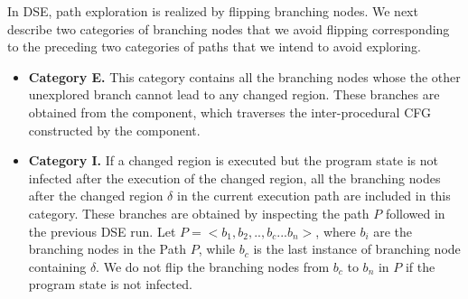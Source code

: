 In DSE, path exploration is realized by flipping branching nodes. We next describe two categories of branching nodes that we avoid flipping corresponding to the preceding two categories of paths that we intend to avoid exploring.
\begin{itemize}

\item \textbf{Category E.} This category contains all the branching nodes whose the other unexplored branch cannot lead to any changed region. These branches are obtained from the  component, which traverses the inter-procedural CFG constructed by the  component.
\item \textbf{Category I.} If a changed region is executed but the program state is not infected after the execution of the changed region, all the branching nodes after the changed region $\delta$ in the current execution path are included in this category. These branches are obtained by inspecting the path $P$ followed in the previous DSE run. Let $P = <b_1, b_2,.., b_c...b_n>$, where $b_i$ are the branching nodes in the Path $P$, while $b_c$ is the last instance of branching node containing $\delta$. We do not flip the branching nodes from $b_c$ to $b_n$ in $P$ if the program state is not infected.
\end{itemize}
